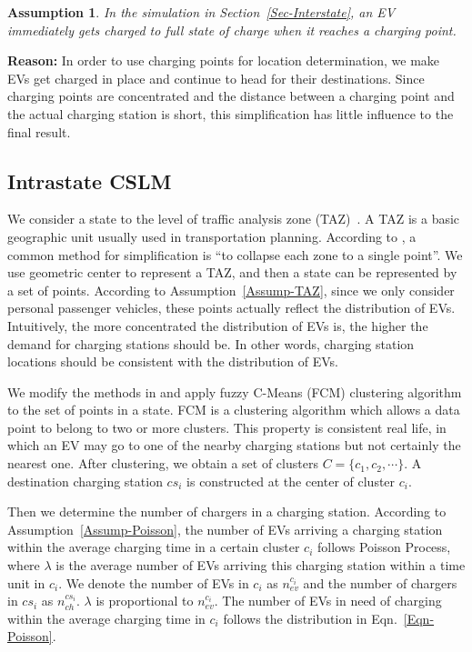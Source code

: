 \documentclass{mcmthesis}
\newtheorem{myassump}{Assumption}
\begin{document}
\begin{myassump}\label{Assump-Simulation}
In the simulation in Section~\ref{Sec-Interstate}, an EV immediately gets charged to full state of charge when it reaches a charging point.
\end{myassump}
\noindent\textbf{Reason:} In order to use charging points for location determination, we make EVs get charged in place and continue to head for their destinations. Since charging points are concentrated and the distance between a charging point and the actual charging station is short, this simplification has little influence to the final result.
\subsection{Intrastate CSLM}\label{Sec-Intrastate}
We consider a state to the level of traffic analysis zone (TAZ)~\cite{TrafficAnalysisZone}. A TAZ is a basic geographic unit usually used in transportation planning. According to \cite{TrafficAnalysisZone}, a common method for simplification is ``to collapse each zone to a single point''. We use geometric center to represent a TAZ, and then a state can be represented by a set of points. According to Assumption~\ref{Assump-TAZ}, since we only consider personal passenger vehicles, these points actually reflect the distribution of EVs. Intuitively, the more concentrated the distribution of EVs is, the higher the demand for charging stations should be. In other words, charging station locations should be consistent with the distribution of EVs.

We modify the methods in \cite{Shi2014} and apply fuzzy C-Means (FCM) clustering algorithm to the set of points in a state. FCM is a clustering algorithm which allows a data point to belong to two or more clusters. This property is consistent real life, in which an EV may go to one of the nearby charging stations but not certainly the nearest one. After clustering, we obtain a set of clusters $C=\{c_{1},c_{2},\cdots\}$. A destination charging station $cs_{i}$ is constructed at the center of cluster $c_{i}$.

Then we determine the number of chargers in a charging station. According to Assumption~\ref{Assump-Poisson}, the number of EVs arriving a charging station within the average charging time in a certain cluster $c_{i}$ follows Poisson Process, where $\lambda$ is the average number of EVs arriving this charging station within a time unit in $c_{i}$. We denote the number of EVs in $c_{i}$ as $n_{ev}^{c_{i}}$ and the number of chargers in $cs_{i}$ as $n_{ch}^{cs_{i}}$. $\lambda$ is proportional to $n_{ev}^{c_{i}}$. The number of EVs in need of charging within the average charging time in $c_{i}$ follows the distribution in Eqn.~\eqref{Eqn-Poisson}.
\end{document}
